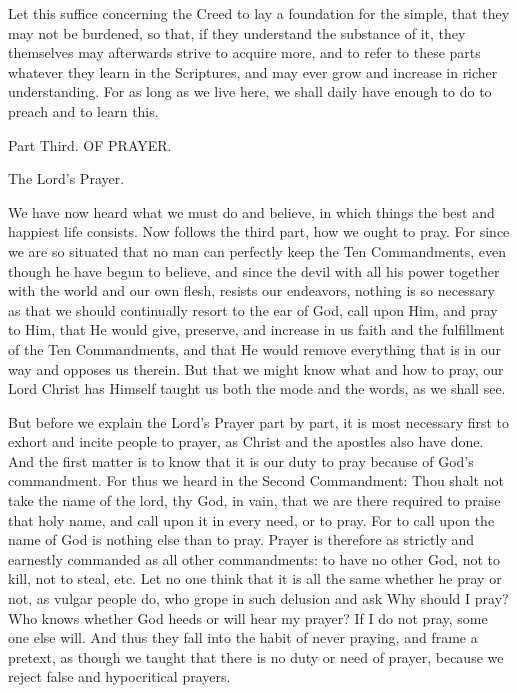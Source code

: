 Let this suffice concerning the Creed to lay a foundation for the
simple, that they may not be burdened, so that, if they understand the
substance of it, they themselves may afterwards strive to acquire more,
and to refer to these parts whatever they learn in the Scriptures, and
may ever grow and increase in richer understanding. For as long as we
live here, we shall daily have enough to do to preach and to learn
this.

Part Third. OF PRAYER.

 The Lord's Prayer.

We have now heard what we must do and believe, in which things the best
and happiest life consists. Now follows the third part, how we ought to
pray. For since we are so situated that no man can perfectly keep the
Ten Commandments, even though he have begun to believe, and since the
devil with all his power together with the world and our own flesh,
resists our endeavors, nothing is so necessary as that we should
continually resort to the ear of God, call upon Him, and pray to Him,
that He would give, preserve, and increase in us faith and the
fulfillment of the Ten Commandments, and that He would remove
everything that is in our way and opposes us therein. But that we might
know what and how to pray, our Lord Christ has Himself taught us both
the mode and the words, as we shall see.

But before we explain the Lord's Prayer part by part, it is most
necessary first to exhort and incite people to prayer, as Christ and
the apostles also have done. And the first matter is to know that it is
our duty to pray because of God's commandment. For thus we heard in the
Second Commandment: Thou shalt not take the name of the lord, thy God,
in vain, that we are there required to praise that holy name, and call
upon it in every need, or to pray. For to call upon the name of God is
nothing else than to pray. Prayer is therefore as strictly and
earnestly commanded as all other commandments: to have no other God,
not to kill, not to steal, etc. Let no one think that it is all the
same whether he pray or not, as vulgar people do, who grope in such
delusion and ask Why should I pray? Who knows whether God heeds or will
hear my prayer? If I do not pray, some one else will. And thus they
fall into the habit of never praying, and frame a pretext, as though we
taught that there is no duty or need of prayer, because we reject false
and hypocritical prayers.

